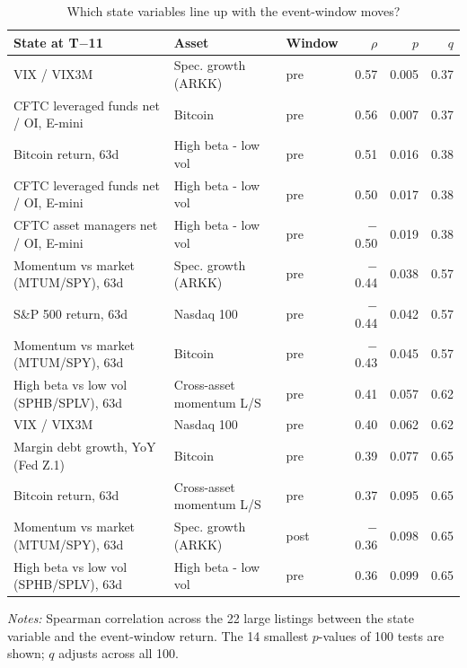 \begin{table}[!htbp]\centering\footnotesize
\caption{Which state variables line up with the event-window moves?}\label{tab:varcorr}

\begin{threeparttable}
\begin{tabular}{lllrrr}
\toprule
State at T$-$11 & Asset & Window & $\rho$ & $p$ & $q$ \\
\midrule
VIX / VIX3M & Spec. growth (ARKK) & pre & 0.57 & 0.005 & 0.37 \\
CFTC leveraged funds net / OI, E-mini & Bitcoin & pre & 0.56 & 0.007 & 0.37 \\
Bitcoin return, 63d & High beta - low vol & pre & 0.51 & 0.016 & 0.38 \\
CFTC leveraged funds net / OI, E-mini & High beta - low vol & pre & 0.50 & 0.017 & 0.38 \\
CFTC asset managers net / OI, E-mini & High beta - low vol & pre & $-$0.50 & 0.019 & 0.38 \\
Momentum vs market (MTUM/SPY), 63d & Spec. growth (ARKK) & pre & $-$0.44 & 0.038 & 0.57 \\
S\&P 500 return, 63d & Nasdaq 100 & pre & $-$0.44 & 0.042 & 0.57 \\
Momentum vs market (MTUM/SPY), 63d & Bitcoin & pre & $-$0.43 & 0.045 & 0.57 \\
High beta vs low vol (SPHB/SPLV), 63d & Cross-asset momentum L/S & pre & 0.41 & 0.057 & 0.62 \\
VIX / VIX3M & Nasdaq 100 & pre & 0.40 & 0.062 & 0.62 \\
Margin debt growth, YoY (Fed Z.1) & Bitcoin & pre & 0.39 & 0.077 & 0.65 \\
Bitcoin return, 63d & Cross-asset momentum L/S & pre & 0.37 & 0.095 & 0.65 \\
Momentum vs market (MTUM/SPY), 63d & Spec. growth (ARKK) & post & $-$0.36 & 0.098 & 0.65 \\
High beta vs low vol (SPHB/SPLV), 63d & High beta - low vol & pre & 0.36 & 0.099 & 0.65 \\
\bottomrule
\end{tabular}
\begin{tablenotes}[flushleft]\footnotesize
\item \textit{Notes:} Spearman correlation across the 22 large listings between the state variable and the event-window return. The 14 smallest $p$-values of 100 tests are shown; $q$ adjusts across all 100.
\end{tablenotes}
\end{threeparttable}

\end{table}
